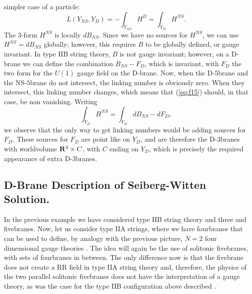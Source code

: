simpler case of a particle:
\begin{equation}
L(Y_{NS},Y_D) = - \int_{Y_{NS}} H^D = \int_{Y_D} H^{NS}.
\label{eq:f15}
\end{equation}
The $3$-form $H^{NS}$ is locally $dB_{NS}$. Since we have no 
sources for $H^{NS}$, we can use $H^{NS}=dB_{NS}$ globally;
however, this requires $B$ to be globally defined, or gauge
invariant. In type IIB string theory, $B$ is not gauge invariant;
however, on a D-brane we can define the combination $B_{NS}-F_D$,
which is invariant, with $F_D$ the two form for the $U(1)$ gauge
field on the D-brane. Now, when the D-$5$brane and the
NS-$5$brane do not intersect, the linking number is obviously
zero. When they intersect, this linking number changes, which
means that (\ref{eq:f15}) should, in that case, be non vanishing.
Writing
\begin{equation}
\int_{Y_D} H^{NS} = \int_{Y_D} dB_{NS} - dF_D,
\label{eq:f16}
\end{equation}
we observe that the only way to get linking numbers would be
adding sources for $F_D$. These sources for $F_D$ are point like
on $Y_D$, and are therefore the D-$3$branes with worldvolume
${\bf R}^3 \times C$, with $C$ ending on $Y_D$, which is
precisely the required appearance of extra D-$3$branes.
  

  

\subsection{D-Brane Description of Seiberg-Witten Solution.}

  
In the previous example we have considered type IIB string theory and three and
fivebranes. Now, let us consider type IIA strings, where we have
fourbranes that can be used to define, by analogy with the
previous picture, $N=2$ four dimensional gauge theories \cite{Wm4}. The idea
will again be the use of solitonic fivebranes, with sets of
fourbranes in between. The only difference now is that the
fivebrane does not create a RR field in type IIA string theory
and, therefore, the physics of the two parallel solitonic
fivebranes does not have the interpretation of a gauge theory, as
was the case for the type IIB configuration above described \cite{Wm4}. 
  
